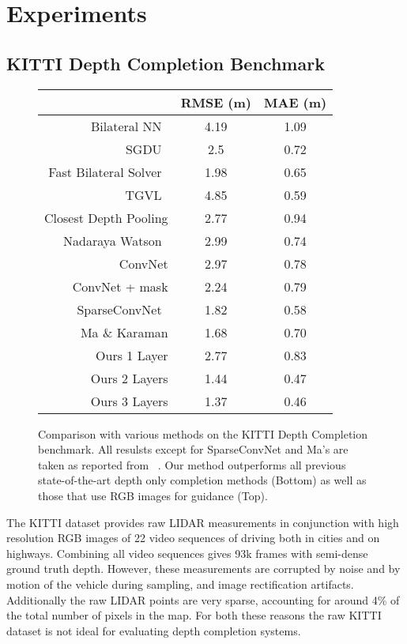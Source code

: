 \section{Experiments}
\subsection{KITTI Depth Completion Benchmark}
\label{sec:kitti-depth-compl}
\begin{figure}
\begin{tabular}{r|cc}
  \label{table:kitti}
  & RMSE (m) & MAE (m)\\\hline
  Bilateral NN~\cite{} & 4.19 & 1.09\\
  SGDU~\cite{} & 2.5 & 0.72\\
  Fast Bilateral Solver~\cite{} & 1.98 & 0.65\\
  TGVL~\cite{} & 4.85 & 0.59\\\hline
  Closest Depth Pooling & 2.77 & 0.94\\
  Nadaraya Watson~\cite{} & 2.99 & 0.74\\
  ConvNet & 2.97 & 0.78\\
  ConvNet + mask & 2.24 & 0.79\\
  SparseConvNet~\cite{} & 1.82 & 0.58\\
  Ma \& Karaman & 1.68 & 0.70\\
  Ours 1 Layer & 2.77 & 0.83\\
  Ours 2 Layers & 1.44 & 0.47\\
  Ours 3 Layers & 1.37 & 0.46
\end{tabular}

\caption{Comparison with various methods on the KITTI Depth Completion benchmark. All resulsts except for SparseConvNet and Ma's are taken as reported from ~\cite{}. Our method outperforms all previous state-of-the-art depth only completion methods (Bottom) as well as those that use RGB images for guidance (Top).}
\label{fig:kitti}
\end{figure}

The KITTI dataset provides raw LIDAR measurements in conjunction with high resolution RGB images of 22 video sequences of driving both in cities and on highways. Combining all video sequences gives 93k frames with semi-dense ground truth depth. However, these measurements are corrupted by noise and by motion of the vehicle during sampling, and image rectification artifacts. Additionally the raw LIDAR points are very sparse, accounting for around 4\% of the total number of pixels in the map. For both these reasons the raw KITTI dataset is not ideal for evaluating depth completion systems.\\

